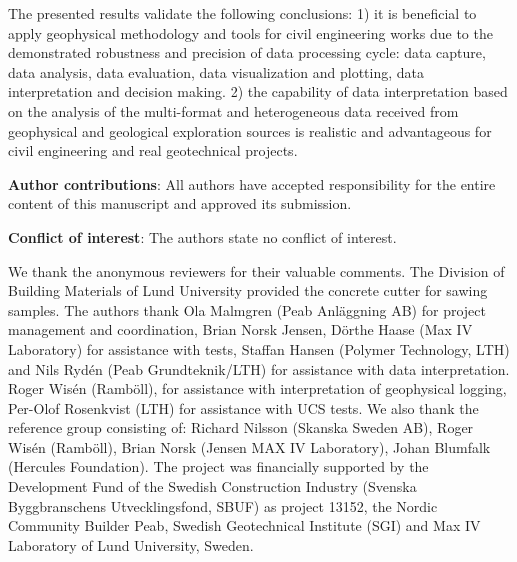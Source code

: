 \documentclass[USenglish,twocolumn]{article}
\begin{document}
The presented results validate the following conclusions: 1) it is beneficial to apply geophysical methodology and tools for civil engineering works due to the demonstrated robustness and precision of data processing cycle: data capture, data analysis, data evaluation, data visualization and plotting, data interpretation and decision making. 2) the capability of data interpretation based on the analysis of the multi-format and heterogeneous data received from geophysical and geological exploration sources is realistic and advantageous for civil engineering and real geotechnical projects.

\vspace{10pt}

\noindent
\textbf{Author contributions}: All authors have accepted responsibility for the entire content of this manuscript and approved its submission.

\vspace{10pt}

\noindent
\textbf{Conflict of interest}: The authors state no conflict of interest.

\begin{acknowledgement}
We thank the anonymous reviewers for their valuable comments. The Division of Building Materials of Lund University provided the concrete cutter for sawing samples. The authors thank Ola Malmgren (Peab Anläggning AB) for project management and coordination, Brian Norsk Jensen, Dörthe Haase (Max IV Laboratory) for assistance with tests, Staffan Hansen (Polymer Technology, LTH) and Nils Rydén (Peab Grundteknik/LTH) for assistance with data interpretation. Roger Wisén (Ramböll), for assistance with interpretation of geophysical logging, Per-Olof Rosenkvist (LTH) for assistance with UCS tests. We also thank the reference group consisting of: Richard Nilsson (Skanska Sweden AB), Roger Wisén (Ramböll), Brian Norsk (Jensen MAX IV Laboratory), Johan Blumfalk (Hercules Foundation). The project was financially supported by the Development Fund of the Swedish Construction Industry (Svenska Byggbranschens Utvecklingsfond, SBUF) as project 13152, the Nordic Community Builder Peab, Swedish Geotechnical Institute (SGI) and Max IV Laboratory of Lund University, Sweden. 
\end{acknowledgement}

%



\end{document}
